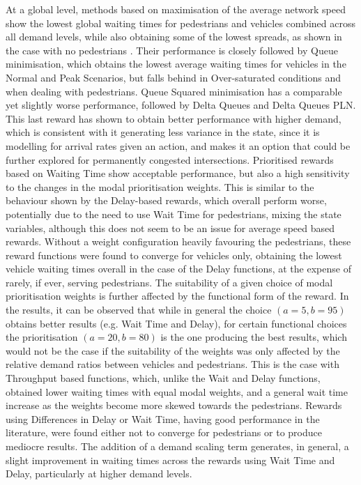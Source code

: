 \documentclass[conference]{IEEEtran}
\begin{document}
At a global level, methods based on maximisation of the average network speed show the lowest global waiting times for pedestrians and vehicles combined across all demand levels, while also obtaining some of the lowest spreads, as shown in the case with no pedestrians \cite{previous}.
Their performance is closely followed by Queue minimisation, which obtains the lowest average waiting times for vehicles in the Normal and Peak Scenarios, but falls behind in Over-saturated conditions and when dealing with pedestrians.
Queue Squared minimisation has a comparable yet slightly worse performance, followed by Delta Queues and Delta Queues PLN.
This last reward has shown to obtain better performance with higher demand, which is consistent with it generating less variance in the state, since it is modelling for arrival rates given an action, and makes it an option that could be further explored for permanently congested intersections.
Prioritised rewards based on Waiting Time show acceptable performance, but also a high sensitivity to the changes in the modal prioritisation weights. 
This is similar to the behaviour shown by the Delay-based rewards, which overall perform worse, potentially due to the need to use Wait Time for pedestrians, mixing the state variables, although this does not seem to be an issue for average speed based rewards.
Without a weight configuration heavily favouring the pedestrians, these reward functions were found to converge for vehicles only, obtaining the lowest vehicle waiting times overall in the case of the Delay functions, at the expense of rarely, if ever, serving pedestrians.
The suitability of a given choice of modal prioritisation weights is further affected by the functional form of the reward.
In the results, it can be observed that while in general the choice $(a=5,b=95)$ obtains better results (e.g. Wait Time and Delay), for certain functional choices the prioritisation $(a=20,b=80)$ is the one producing the best results, which would not be the case if the suitability of the weights was only affected by the relative demand ratios between vehicles and pedestrians. 
This is the case with Throughput based functions, which, unlike the Wait and Delay functions, obtained lower waiting times with equal modal weights, and a general wait time increase as the weights become more skewed towards the pedestrians.
Rewards using Differences in Delay or Wait Time, having good performance in the literature, were found either not to converge for pedestrians or to produce mediocre results.
The addition of a demand scaling term generates, in general, a slight improvement in waiting times across the rewards using Wait Time and Delay, particularly at higher demand levels. 
\end{document}
